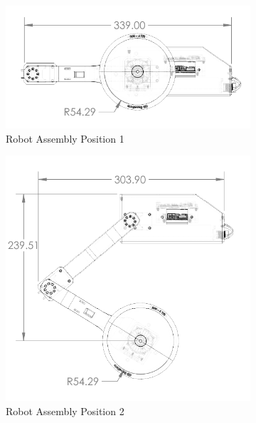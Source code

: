 \begin{figure}[h!]
	\centering
	\begin{subfigure}[b]{0.3\textwidth}
		\centering
		\includegraphics[width=.9\linewidth]{Robot_Assembly_V2_position_1}
		\caption{Robot Assembly Position 1}
		\label{fig:robotassemblyv2position1}
	\end{subfigure}
	\begin{subfigure}[b]{0.3\textwidth}
		\centering
		\includegraphics[width=.9\linewidth]{Robot_Assembly_V2_position_2}
		\caption{Robot Assembly Position 2}
		\label{fig:robotassemblyv2position2}
	\end{subfigure}
	\begin{subfigure}[b]{0.3\textwidth}
		\centering

\end{subfigure}
\end{figure}
